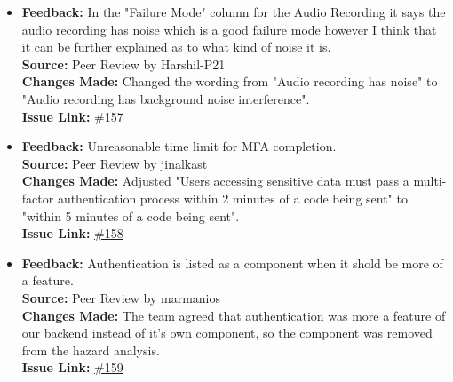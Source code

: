 \documentclass{article}
\begin{document}
\begin{itemize}
      \item 
      \textbf{Feedback:} In the "Failure Mode" column for the Audio Recording it says the audio recording has noise which is a good failure mode however I think that it can be further explained as to what kind of noise it is. \\
      \textbf{Source:} Peer Review by Harshil-P21 \\
      \textbf{Changes Made:} Changed the wording from "Audio recording has noise" to "Audio recording has background noise interference". \\
      \textbf{Issue Link:} \href{https://github.com/parishanizam/TeleHealth/issues/157}{\#157}

      \item 
      \textbf{Feedback:} Unreasonable time limit for MFA completion. \\
      \textbf{Source:} Peer Review by jinalkast \\
      \textbf{Changes Made:} Adjusted "Users accessing sensitive data must pass a multi-factor authentication process within 2 minutes of a code being sent" to "within 5 minutes of a code being sent". \\
      \textbf{Issue Link:} \href{https://github.com/parishanizam/TeleHealth/issues/158}{\#158}

      \item 
      \textbf{Feedback:} Authentication is listed as a component when it shold be more of a feature. \\
      \textbf{Source:} Peer Review by marmanios \\
      \textbf{Changes Made:} The team agreed that authentication was more a feature of our backend instead of it's own component, so the component was removed from the hazard analysis. \\
      \textbf{Issue Link:} \href{https://github.com/parishanizam/TeleHealth/issues/159}{\#159}

\end{itemize}
\end{document}
